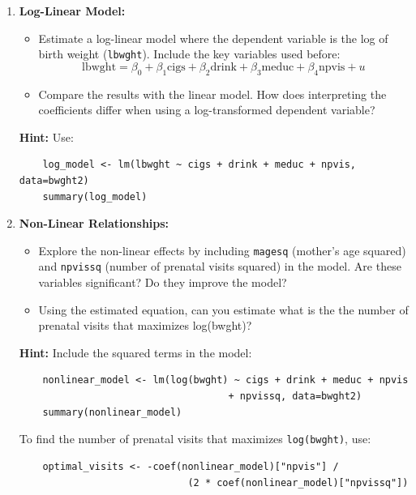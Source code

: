 \documentclass[11pt,a4paper,english]{article}
\begin{document}
\begin{enumerate}[itemsep=-0.5ex]
    \item \textbf{Log-Linear Model:}
    \begin{itemize}[itemsep=-0.5ex]
        \item Estimate a log-linear model where the dependent variable is the log of birth weight (\texttt{lbwght}). Include the key variables used before:
        \[
        \text{lbwght} = \beta_0 + \beta_1 \text{cigs} + \beta_2 \text{drink} + \beta_3 \text{meduc} + \beta_4 \text{npvis} + u
        \]
        \item Compare the results with the linear model. How does interpreting the coefficients differ when using a log-transformed dependent variable?
    \end{itemize}
    \textbf{Hint:} Use:
    \begin{verbatim}
    log_model <- lm(lbwght ~ cigs + drink + meduc + npvis, data=bwght2)
    summary(log_model)
    \end{verbatim}
    
    \item \textbf{Non-Linear Relationships:}
    \begin{itemize}[itemsep=-0.5ex]
        \item Explore the non-linear effects by including \texttt{magesq} (mother’s age squared) and \texttt{npvissq} (number of prenatal visits squared) in the model. Are these variables significant? Do they improve the model?
        \item Using the estimated equation, can you estimate what is the the number of prenatal visits that maximizes log(bwght)?
    \end{itemize}
    \textbf{Hint:} Include the squared terms in the model:
    \begin{verbatim}
    nonlinear_model <- lm(log(bwght) ~ cigs + drink + meduc + npvis 
                                    + npvissq, data=bwght2)
    summary(nonlinear_model)
    \end{verbatim}
    To find the number of prenatal visits that maximizes \texttt{log(bwght)}, use:
    \begin{verbatim}
    optimal_visits <- -coef(nonlinear_model)["npvis"] / 
                             (2 * coef(nonlinear_model)["npvissq"])
    \end{verbatim}
    
\end{enumerate}
\end{document}
